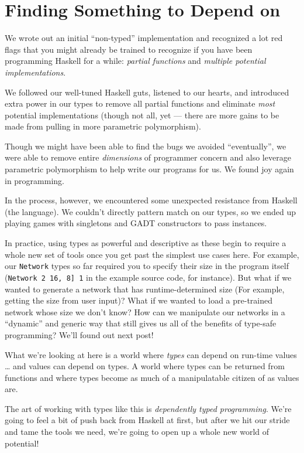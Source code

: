 \documentclass[]{article}
\begin{document}
\hypertarget{finding-something-to-depend-on}{%
\section{Finding Something to Depend on}\label{finding-something-to-depend-on}}

We wrote out an initial ``non-typed'' implementation and recognized a lot red
flags that you might already be trained to recognize if you have been
programming Haskell for a while: \emph{partial functions} and \emph{multiple
potential implementations}.

We followed our well-tuned Haskell guts, listened to our hearts, and introduced
extra power in our types to remove all partial functions and eliminate
\emph{most} potential implementations (though not all, yet --- there are more
gains to be made from pulling in more parametric polymorphism).

Though we might have been able to find the bugs we avoided ``eventually'', we
were able to remove entire \emph{dimensions} of programmer concern and also
leverage parametric polymorphism to help write our programs for us. We found joy
again in programming.

In the process, however, we encountered some unexpected resistance from Haskell
(the language). We couldn't directly pattern match on our types, so we ended up
playing games with singletons and GADT constructors to pass instances.

In practice, using types as powerful and descriptive as these begin to require a
whole new set of tools once you get past the simplest use cases here. For
example, our \texttt{Network} types so far required you to specify their size in
the program itself (\texttt{Network\ 2\ \textquotesingle{}{[}16,\ 8{]}\ 1} in
the example source code, for instance). But what if we wanted to generate a
network that has runtime-determined size (For example, getting the size from
user input)? What if we wanted to load a pre-trained network whose size we don't
know? How can we manipulate our networks in a ``dynamic'' and generic way that
still gives us all of the benefits of type-safe programming? We'll found out
next post!

What we're looking at here is a world where \emph{types} can depend on run-time
values \ldots{} and values can depend on types. A world where types can be
returned from functions and where types become as much of a manipulatable
citizen of as values are.

The art of working with types like this is \emph{dependently typed programming}.
We're going to feel a bit of push back from Haskell at first, but after we hit
our stride and tame the tools we need, we're going to open up a whole new world
of potential!
\end{document}
